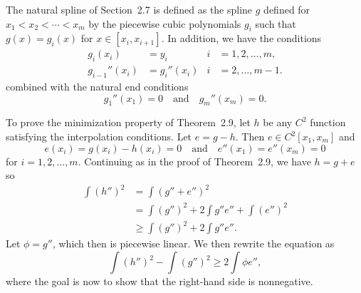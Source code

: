 \begin{solution}
    The natural spline of Section~2.7 is defined as the spline $g$ defined for $x_1 < x_2 < \cdots < x_m$ by the piecewise cubic polynomials $g_i$ such that $g(x) = g_i(x)$ for $x \in [x_i, x_{i+1}]$.
    In addition, we have the conditions
    \begin{align*}
        g_i(x_i) &= y_i & i &= 1, 2, \ldots, m, \\
        g_{i-1}''(x_i) &= g_i''(x_i) & i &= 2, \ldots, m-1.
    \end{align*}
    combined with the natural end conditions
    \begin{equation*}
        g_{1}''(x_1) = 0
        \quad \text{and} \quad
        g_{m}''(x_m) = 0.
    \end{equation*}

    To prove the minimization property of Theorem~2.9, let $h$ be any $C^2$ function satisfying the interpolation conditions.
    Let $e = g - h$.
    Then $e \in C^2[x_1, x_m]$ and
    \begin{equation*}
        e(x_i) = g(x_i) - h(x_i) = 0
        \quad \text{and} \quad
        e''(x_1) = e''(x_m) = 0
    \end{equation*}
    for $i = 1, 2, \ldots, m$.
    Continuing as in the proof of Theorem~2.9, we have $h = g + e$ so
    \begin{align*}
        \int (h'')^2
        &= \int (g'' + e'')^2 \\
        &= \int (g'')^2 + 2 \int g'' e'' + \int (e'')^2 \\
        &\geq \int (g'')^2 + 2 \int g'' e''.
    \end{align*}
    Let $\phi = g''$, which then is piecewise linear.
    We then rewrite the equation as
    \begin{equation*}
        \int (h'')^2 - \int (g'')^2 \geq 2 \int \phi e'',
    \end{equation*}
    where the goal is now to show that the right-hand side is nonnegative.


\end{solution}
